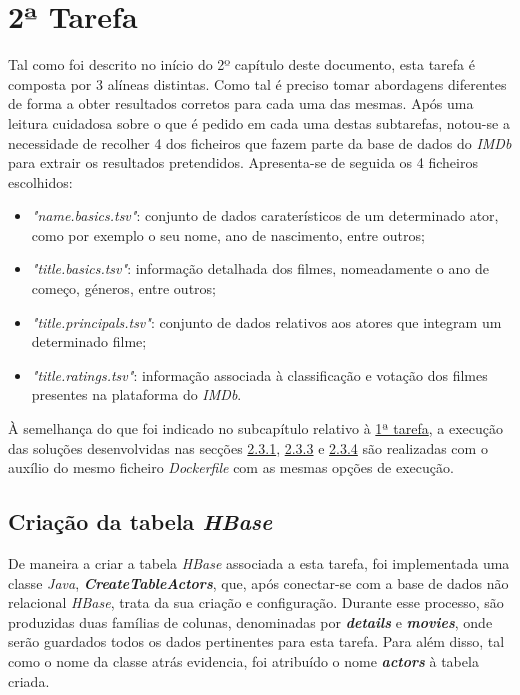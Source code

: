 \documentclass[a4paper]{report}
\begin{document}
{	\section{2ª Tarefa} \label{sec:Task2}
	Tal como foi descrito no início do 2º capítulo deste documento, esta tarefa é composta por 3 alíneas distintas. Como tal é preciso tomar abordagens diferentes de forma a obter resultados corretos para cada uma das mesmas. 
	Após uma leitura cuidadosa sobre o que é pedido em cada uma destas subtarefas, notou-se a necessidade de recolher 4 dos ficheiros que fazem parte da base de dados do \textit{IMDb} para extrair os resultados pretendidos.
	Apresenta-se de seguida os 4 ficheiros escolhidos:
	\begin{itemize}
		\item \textit{"name.basics.tsv"}: conjunto de dados caraterísticos de um determinado ator, como por exemplo o seu nome, ano de nascimento, entre outros;
		\item \textit{"title.basics.tsv"}: informação detalhada dos filmes, nomeadamente o ano de começo, géneros, entre outros;
		\item \textit{"title.principals.tsv"}: conjunto de dados relativos aos atores que integram um determinado filme;
		\item \textit{"title.ratings.tsv"}: informação associada à classificação e votação dos filmes presentes na plataforma do \textit{IMDb}.
	\end{itemize}
	
	À semelhança do que foi indicado no subcapítulo relativo à \hyperref[sec:Task1]{1ª tarefa}, a execução das soluções desenvolvidas nas secções \hyperref[subsec:Task2-1]{2.3.1}, \hyperref[subsec:Task2-3]{2.3.3} e \hyperref[subsec:Task2-4]{2.3.4} são realizadas com o auxílio do mesmo ficheiro \textit{Dockerfile} com as mesmas opções de execução.
		
		\subsection{Criação da tabela \textit{HBase}} \label{subsec:Task2-1}
		De maneira a criar a tabela \textit{HBase} associada a esta tarefa, foi implementada uma classe \textit{Java}, \textbf{\textit{CreateTableActors}}, que, após conectar-se com a base de dados não relacional \textit{HBase}, trata da sua criação e configuração.
		Durante esse processo, são produzidas duas famílias de colunas, denominadas por \textbf{\textit{details}} e \textbf{\textit{movies}}, onde serão guardados todos os dados pertinentes para esta tarefa. Para além disso, tal como o nome da classe atrás evidencia, foi atribuído o nome \textbf{\textit{actors}} à tabela criada.

}
\end{document}
